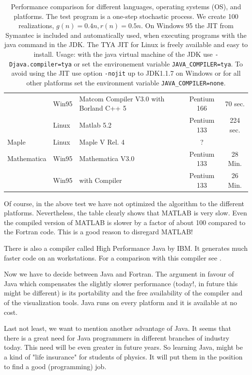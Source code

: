 \begin{table}[htbp]
\begin{center}
\begin{tabular}{llp{3cm}|c|c}
           & Win95 & Matcom Compiler V3.0 with Borland C++ 5 & Pentium 166 & 70 sec.\\
           & Linux & Matlab 5.2 & Pentium 133 &  224 sec.\\\hline
   Maple   & Linux & Maple V Rel. 4 & ? & \\\hline
Mathematica& Win95 & Mathematica V3.0 & Pentium 133 & 28 Min. \\
           & Win95 & with Compiler    & Pentium 133 & 26 Min. \\ \hline
    \end{tabular}
    \caption[Performance Table.]%
    {Performance comparison for different languages, operating
      systems (OS), and platforms.
      The test program is a one-step stochastic process. We create 100
      realizations, $g(n)=0.4n, r(n)=0.5n$. On Windows 95 the JIT from
      Symantec is included and automatically used, when executing programs
      with the java command in the JDK. The TYA JIT for Linux is freely
      available and easy to install. Usage: with the java virtual machine of
      the JDK use \texttt{-Djava.compiler=tya} or 
      set the environement variable \texttt{JAVA\_COMPILER=tya}. To avoid
      using the JIT use option \texttt{-nojit} up to JDK1.1.7 on Windows or
      for all other platforms set the environment variable 
      \texttt{JAVA\_COMPILER=none}.
      }
    \label{tab:performance}
  \end{center}
\end{table}


Of course, in the above test we have not optimized the algorithm to the 
different platforms. Nevertheless, the table clearly shows that MATLAB is 
very slow. Even the compiled version of MATLAB is slower by a factor of 
about 100 
compared to the Fortran code. This is a good reason to disregard MATLAB!

There is also a compiler called High Performance Java by IBM. It generates
much faster code on an workstations. For a comparison with this
compiler see \cite{HPJ}.

Now we have to decide between Java and Fortran. The argument in favour of 
Java which compensates the slightly slower performance (today!, in future 
this might be different) is its portability and the free availability of the
compiler and of the visualization tools. Java runs on every platform and 
it is available at no cost. 

Last not least, we want to mention another advantage of Java. It seems
\cite[]{bigbucks} that there is  a great need for Java programmers in 
different branches of industry today. This need will be even greater in future 
years. So learning Java, might be a kind of "life insurance" for students of 
physics. It will put them in the position to find a good (programming) job.


